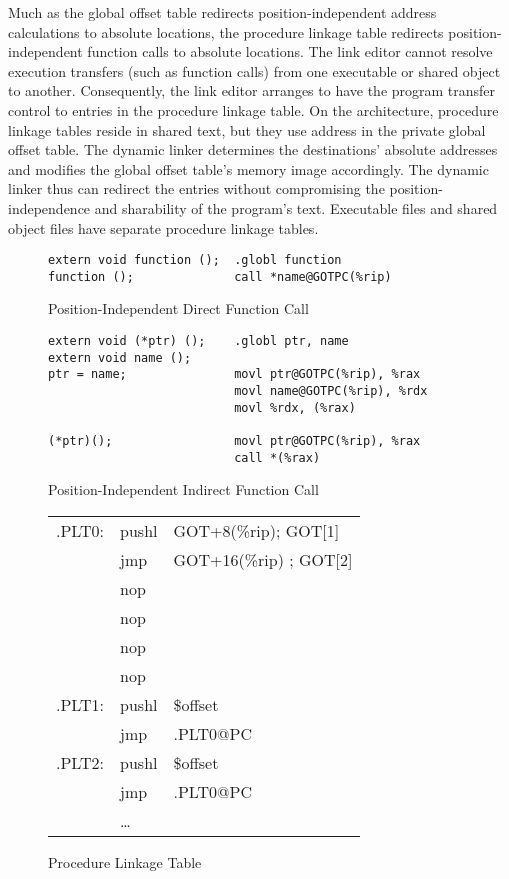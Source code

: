 Much as the global offset table redirects position-independent address
calculations to absolute locations, the procedure linkage table
redirects position-independent function calls to absolute locations.
The link editor cannot resolve execution transfers (such as function
calls) from one executable or shared object to another.  Consequently,
the link editor arranges to have the program transfer control to
entries in the procedure linkage table.  On the \xARCH architecture,
procedure linkage tables reside in shared text, but they use address
in the private global offset table.  The dynamic linker determines the
destinations' absolute addresses and modifies the global offset
table's memory image accordingly.  The dynamic linker thus can
redirect the entries without compromising the position-independence
and sharability of the program's text.  Executable files and shared
object files have separate procedure linkage tables.  

\begin{figure}[H]
\caption{Position-Independent Direct Function Call}
\begin{verbatim}
extern void function ();  .globl function
function ();              call *name@GOTPC(%rip)
\end{verbatim}
\end{figure}


\begin{figure}[H]
\caption{Position-Independent Indirect Function Call}
\begin{verbatim}
extern void (*ptr) ();    .globl ptr, name
extern void name ();
ptr = name;               movl ptr@GOTPC(%rip), %rax
                          movl name@GOTPC(%rip), %rdx
                          movl %rdx, (%rax)

(*ptr)();                 movl ptr@GOTPC(%rip), %rax
                          call *(%rax)
\end{verbatim}
\end{figure}


\begin{figure}[H]
\caption{Procedure Linkage Table}
\begin{tabular}{lll}
.PLT0: & pushl & GOT+8(\%rip); GOT[1]\\
& jmp &GOT+16(\%rip) ; GOT[2] \\
& nop & \\
& nop & \\
& nop & \\
& nop & \\
.PLT1: & pushl & \$offset \\
&jmp &.PLT0@PC \\
.PLT2: &pushl & \$offset \\
& jmp & .PLT0@PC \\
&\dots\\
\end{tabular}
\end{figure}


